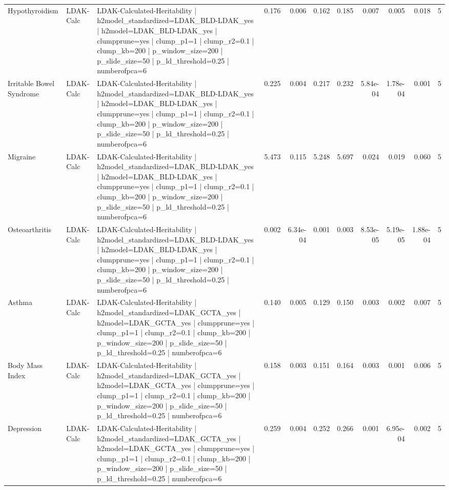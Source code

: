 \begin{landscape}
\begin{longtable}{p{2.4cm}p{1.8cm}p{6.0cm}rrrrrrrr}
Hypothyroidism & LDAK-Calc & LDAK-Calculated-Heritability | h2model\_standardized=LDAK\_BLD-LDAK\_yes | h2model=LDAK\_BLD-LDAK\_yes | clumpprune=yes | clump\_p1=1 | clump\_r2=0.1 | clump\_kb=200 | p\_window\_size=200 | p\_slide\_size=50 | p\_ld\_threshold=0.25 | numberofpca=6 & 0.176 & 0.006 & 0.162 & 0.185 & 0.007 & 0.005 & 0.018 & 5 \\
Irritable Bowel Syndrome & LDAK-Calc & LDAK-Calculated-Heritability | h2model\_standardized=LDAK\_BLD-LDAK\_yes | h2model=LDAK\_BLD-LDAK\_yes | clumpprune=yes | clump\_p1=1 | clump\_r2=0.1 | clump\_kb=200 | p\_window\_size=200 | p\_slide\_size=50 | p\_ld\_threshold=0.25 | numberofpca=6 & 0.225 & 0.004 & 0.217 & 0.232 & 5.84e-04 & 1.78e-04 & 0.001 & 5 \\
Migraine & LDAK-Calc & LDAK-Calculated-Heritability | h2model\_standardized=LDAK\_BLD-LDAK\_yes | h2model=LDAK\_BLD-LDAK\_yes | clumpprune=yes | clump\_p1=1 | clump\_r2=0.1 | clump\_kb=200 | p\_window\_size=200 | p\_slide\_size=50 | p\_ld\_threshold=0.25 | numberofpca=6 & 5.473 & 0.115 & 5.248 & 5.697 & 0.024 & 0.019 & 0.060 & 5 \\
Osteoarthritis & LDAK-Calc & LDAK-Calculated-Heritability | h2model\_standardized=LDAK\_BLD-LDAK\_yes | h2model=LDAK\_BLD-LDAK\_yes | clumpprune=yes | clump\_p1=1 | clump\_r2=0.1 | clump\_kb=200 | p\_window\_size=200 | p\_slide\_size=50 | p\_ld\_threshold=0.25 | numberofpca=6 & 0.002 & 6.34e-04 & 0.001 & 0.003 & 8.53e-05 & 5.19e-05 & 1.88e-04 & 5 \\
Asthma & LDAK-Calc & LDAK-Calculated-Heritability | h2model\_standardized=LDAK\_GCTA\_yes | h2model=LDAK\_GCTA\_yes | clumpprune=yes | clump\_p1=1 | clump\_r2=0.1 | clump\_kb=200 | p\_window\_size=200 | p\_slide\_size=50 | p\_ld\_threshold=0.25 | numberofpca=6 & 0.140 & 0.005 & 0.129 & 0.150 & 0.003 & 0.002 & 0.007 & 5 \\
Body Mass Index & LDAK-Calc & LDAK-Calculated-Heritability | h2model\_standardized=LDAK\_GCTA\_yes | h2model=LDAK\_GCTA\_yes | clumpprune=yes | clump\_p1=1 | clump\_r2=0.1 | clump\_kb=200 | p\_window\_size=200 | p\_slide\_size=50 | p\_ld\_threshold=0.25 | numberofpca=6 & 0.158 & 0.003 & 0.151 & 0.164 & 0.003 & 0.001 & 0.006 & 5 \\
Depression & LDAK-Calc & LDAK-Calculated-Heritability | h2model\_standardized=LDAK\_GCTA\_yes | h2model=LDAK\_GCTA\_yes | clumpprune=yes | clump\_p1=1 | clump\_r2=0.1 | clump\_kb=200 | p\_window\_size=200 | p\_slide\_size=50 | p\_ld\_threshold=0.25 | numberofpca=6 & 0.259 & 0.004 & 0.252 & 0.266 & 0.001 & 6.95e-04 & 0.002 & 5 \\

\end{longtable}
\end{landscape}
